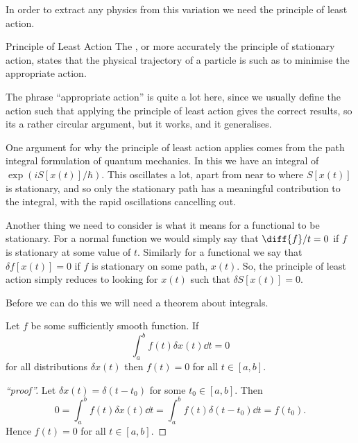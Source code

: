 \documentclass[fleqn]{NotesClass}
\begin{document}
    In order to extract any physics from this variation we need the principle of least action.
    
    \begin{clm}{Principle of Least Action}{}
        The , or more accurately the principle of stationary action, states that the physical trajectory of a particle is such as to minimise the appropriate action.
    \end{clm}
    The phrase \enquote{appropriate action} is quite a lot here, since we usually define the action such that applying the principle of least action gives the correct results, so its a rather circular argument, but it works, and it generalises.
    
    One argument for why the principle of least action applies comes from the path integral formulation of quantum mechanics.
    In this we have an integral of \(\exp(i S[x(t)]/\hbar)\).
    This oscillates a lot, apart from near to where \(S[x(t)]\) is stationary, and so only the stationary path has a meaningful contribution to the integral, with the rapid oscillations cancelling out.
    
    Another thing we need to consider is what it means for a functional to be stationary.
    For a normal function we would simply say that \(\diff{f}/{t} = 0\) if \(f\) is stationary at some value of \(t\).
    Similarly for a functional we say that \(\delta f[x(t)] = 0\) if \(f\) is stationary on some path, \(x(t)\).
    So, the principle of least action simply reduces to looking for \(x(t)\) such that \(\delta S[x(t)] = 0\).
    
    Before we can do this we will need a theorem about integrals.
    
    \begin{thm}{}{}
        Let \(f\) be some sufficiently smooth function.
        If
        \begin{equation}
            \int_a^b f(t) \delta x(t) \dd{t} = 0
        \end{equation}
        for all distributions \(\delta x(t)\) then \(f(t) = 0\) for all \(t \in [a, b]\).
        
        \begin{proof}[\enquote{proof}]
            Let \(\delta x(t) = \delta(t - t_0)\) for some \(t_0 \in [a, b]\).
            Then
            \begin{equation}
                0 = \int_a^b f(t) \delta x(t) \dd{t} = \int_a^b f(t) \delta(t - t_0) \dd{t} = f(t_0).
            \end{equation}
            Hence \(f(t) = 0\) for all \(t \in [a, b]\).
        \end{proof}
    \end{thm}
    
\end{document}
